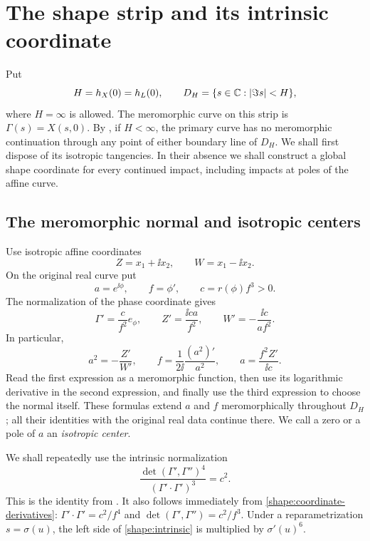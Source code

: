 \section{The shape strip and its intrinsic coordinate}
\label{sec:shapes}

Put
\[
 H=h_X(0)=h_L(0),\qquad D_H=\{s\in\mathbb C:|\Im s|<H\},
\]
where \(H=\infty\) is allowed. The meromorphic curve on this strip is
\(\Gamma(s)=X(s,0)\). By , if
\(H<\infty\), the primary curve has no meromorphic continuation through
any point of either boundary line of \(D_H\). We shall first dispose of
its isotropic tangencies. In their absence we shall construct a global
shape coordinate for every continued impact, including impacts at poles
of the affine curve.

\subsection{The meromorphic normal and isotropic centers}

Use isotropic affine coordinates
\[
 Z=x_1+\ii x_2,\qquad W=x_1-\ii x_2.
\]
On the original real curve put
\[
 a=e^{\ii\phi},\qquad f=\phi',\qquad
 c=r(\phi)f^3>0.
\]
The normalization of the phase coordinate gives
\begin{equation}
 \Gamma'=\frac{c}{f^2}e_\phi,\qquad
 Z'=\frac{\ii c a}{f^2},\qquad
 W'=-\frac{\ii c}{a f^2}.
 \label{shape:coordinate-derivatives}
\end{equation}
In particular,
\begin{equation}
 a^2=-\frac{Z'}{W'},\qquad
 f=\frac{1}{2\ii}\frac{(a^2)'}{a^2},\qquad
 a=\frac{f^2Z'}{\ii c}.
 \label{shape:normal-reconstruction}
\end{equation}
Read the first expression as a meromorphic function, then use its
logarithmic derivative in the second expression, and finally use the
third expression to choose the normal itself. These formulas extend
\(a\) and \(f\) meromorphically throughout \(D_H\); all their identities
with the original real data continue there. We call a zero or a pole of
\(a\) an \emph{isotropic center}.

We shall repeatedly use the intrinsic normalization
\begin{equation}
 \frac{\det(\Gamma',\Gamma'')^4}
 {(\Gamma'\mathbin{\cdot}\Gamma')^3}=c^2.
 \label{shape:intrinsic}
\end{equation}
This is the identity from . It also
follows immediately from \eqref{shape:coordinate-derivatives}:
\(\Gamma'\cdot\Gamma'=c^2/f^4\) and
\(\det(\Gamma',\Gamma'')=c^2/f^3\). Under a reparametrization
\(s=\sigma(u)\), the left side of \eqref{shape:intrinsic} is multiplied
by \(\sigma'(u)^6\).


